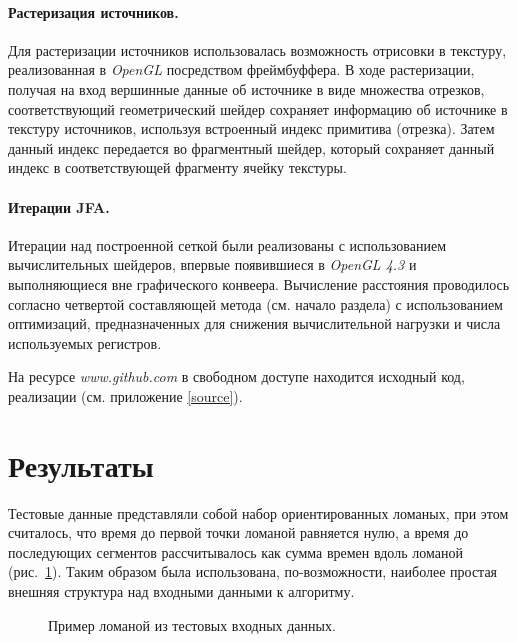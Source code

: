 \documentclass[12pt]{article}
\begin{document}
\paragraph{Растеризация источников.} Для растеризации источников 
использовалась возможность отрисовки в текстуру, реализованная в \emph{OpenGL}
посредством фреймбуффера. В ходе растеризации, получая на вход вершинные данные об
источнике в виде множества отрезков, соответствующий геометрический шейдер 
сохраняет информацию об источнике в текстуру источников, используя встроенный 
индекс примитива (отрезка). Затем данный индекс передается во фрагментный шейдер,
который сохраняет данный индекс в соответствующей фрагменту ячейку текстуры.

\paragraph{Итерации JFA.} Итерации над построенной сеткой были
реализованы с использованием вычислительных шейдеров,
впервые появившиеся в \emph{OpenGL 4.3} и выполняющиеся вне
графического конвеера. Вычисление расстояния проводилось согласно 
четвертой составляющей метода (см. начало раздела) с использованием 
оптимизаций, предназначенных для снижения вычислительной нагрузки и 
числа используемых регистров.

На ресурсе \emph{www.github.com} в свободном доступе находится исходный код, 
реализации (см. приложение \ref{source}).

\section{Результаты}
Тестовые данные представляли собой набор ориентированных ломаных, при этом
считалось, что время до первой точки ломаной равняется нулю, а время до 
последующих сегментов рассчитывалось как сумма времен вдоль ломаной (рис.~\ref{fig_input}).
Таким образом была использована, по-возможности, наиболее простая внешняя структура
над входными данными к алгоритму.
\begin{figure}
\label{fig_input}
\begin{center}
\end{center}
\caption{Пример ломаной из тестовых входных данных.}
\end{figure}
\end{document}
